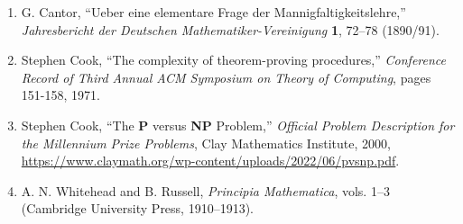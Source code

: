 \documentclass[11pt]{article}
\begin{document}
    \begin{enumerate}
        \item G. Cantor, ``Ueber eine elementare Frage der
        Mannigfaltigkeitslehre,'' \emph{Jahresbericht der Deutschen
        Mathematiker-Vereinigung} \textbf{1}, 72--78 (1890/91).

        \item Stephen Cook, ``The complexity of theorem-proving procedures,''
        \emph{Conference Record of Third Annual ACM Symposium on Theory of Computing},
        pages 151-158, 1971.

        \item Stephen Cook, ``The \textbf{P} versus \textbf{NP} Problem,''
        \emph{Official Problem Description for the Millennium Prize Problems},
        Clay Mathematics Institute, 2000,
        \url{https://www.claymath.org/wp-content/uploads/2022/06/pvsnp.pdf}.

        \item A. N. Whitehead and B. Russell, \emph{Principia Mathematica},
        vols. 1--3 (Cambridge University Press, 1910--1913).
    \end{enumerate}
\end{document}

